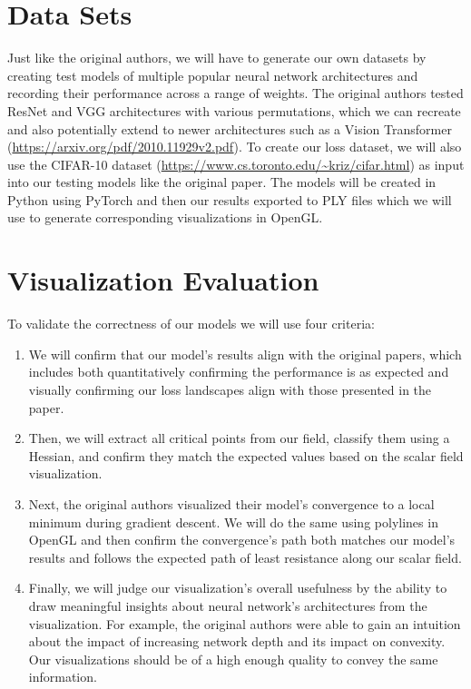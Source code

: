 \documentclass{acmsiggraph}
\begin{document}
\section{Data Sets}
\label{sec:intro}

Just like the original authors, we will have to generate our own datasets by creating test models of multiple popular neural network architectures and recording their performance across a range of weights. The original authors tested ResNet and VGG architectures with various permutations, which we can recreate and also potentially extend to newer architectures such as a Vision Transformer (\url{https://arxiv.org/pdf/2010.11929v2.pdf}). To create our loss dataset, we will also use the CIFAR-10 dataset (\url{https://www.cs.toronto.edu/~kriz/cifar.html}) as input into our testing models like the original paper. The models will be created in Python using PyTorch and then our results exported to PLY files which we will use to generate corresponding visualizations in OpenGL.


\section{Visualization Evaluation}
\label{sec:intro}
To validate the correctness of our models we will use four criteria:
\begin{enumerate}
	\item We will confirm that our model's results align with the original papers, which includes both quantitatively confirming the performance is as expected and visually confirming our loss landscapes align with those presented in the paper.
	\item Then, we will extract all critical points from our field, classify them using a Hessian, and confirm they match the expected values based on the scalar field visualization.
	\item Next, the original authors visualized their model’s convergence to a local minimum during gradient descent. We will do the same using polylines in OpenGL and then confirm the convergence’s path both matches our model’s results and follows the expected path of least resistance along our scalar field.
	\item Finally, we will judge our visualization’s overall usefulness by the ability to draw meaningful insights about neural network’s architectures from the visualization. For example, the original authors were able to gain an intuition about the impact of increasing network depth and its impact on convexity. Our visualizations should be of a high enough quality to convey the same information.
\end{enumerate}
\end{document}
